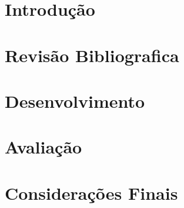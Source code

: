 \documentclass{ufscThesis} %
\begin{document}
\chapter{Introdu\c{c}\~ao}


\chapter{Revis\~ao Bibliografica}


%

\chapter{Desenvolvimento}


\chapter{Avalia\c{c}\~ao}


\chapter{Considera\c{c}\~oes Finais}


{}



%
\end{document}
